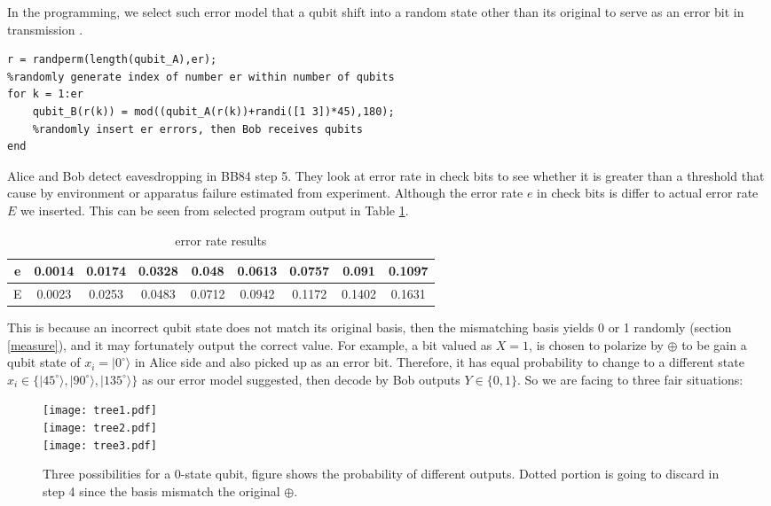 \documentclass[12pt]{article}
\begin{document}
In the programming, we select such error model that a qubit shift into a random state other than its original to serve as an error bit in transmission \cite{yen2003error}.
\begin{lstlisting}
r = randperm(length(qubit_A),er);
%randomly generate index of number er within number of qubits
for k = 1:er
    qubit_B(r(k)) = mod((qubit_A(r(k))+randi([1 3])*45),180);
    %randomly insert er errors, then Bob receives qubits
end
\end{lstlisting}
Alice and Bob detect eavesdropping in BB84 step 5. They look at error rate in check bits to see whether it is greater than a threshold that cause by environment or apparatus failure estimated from experiment. Although the error rate $e$ in check bits is differ to actual error rate $E$ we inserted. This can be seen from selected program output in Table \ref{err_table}.
\begin{table}[H]
\centering
\begin{tabular}{c|c|c|c|c|c|c|c|c}
  \toprule
   e & 0.0014 & 0.0174 & 0.0328 &0.048&0.0613&0.0757&0.091&0.1097\\\midrule
  E    & 0.0023 & 0.0253& 0.0483 &0.0712&0.0942&0.1172&0.1402&0.1631\\
  \bottomrule
\end{tabular}
\caption{error rate results}\label{err_table}
\end{table}
 This is because an incorrect qubit state does not match its original basis, then the mismatching basis yields 0 or 1 randomly (section \ref{measure}), and it may fortunately output the correct value. For example, a bit valued as $X=1$, is chosen to polarize by $\oplus$ to be gain a qubit state of $x_i=|0^\circ\rangle$ in Alice side and also picked up as an error bit. Therefore, it has equal probability to change to a different state $x_i\in \{|45^\circ\rangle,|90^\circ\rangle,|135^\circ\rangle\}$ as our error model suggested, then decode by Bob outputs $Y\in\{0,1\}$. So we are facing to three fair situations:
\begin{figure}[H]
\begin{center}
\texttt{[image: tree1.pdf]} 
\\
\texttt{[image: tree2.pdf]} \\
\texttt{[image: tree3.pdf]}
\end{center}
\caption{Three possibilities for a 0-state qubit, figure shows the probability of different outputs. Dotted portion is going to discard in step 4 since the basis mismatch the original $\oplus$.}
\end{figure}
\end{document}
